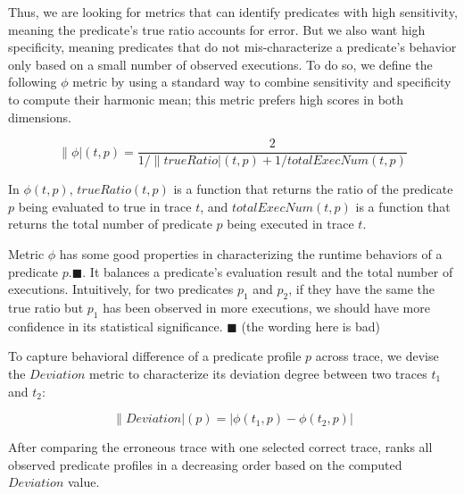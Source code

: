 Thus, we are looking for metrics that can identify
predicates with high sensitivity, meaning the predicate's true
ratio accounts for error. But we also want
high specificity, meaning predicates that do not mis-characterize
a predicate's behavior only based on a small number of
observed executions. To do so, we define the following
$\phi$ metric by using a standard way to
combine sensitivity and specificity to compute their
harmonic mean; this metric prefers high scores in both dimensions. 

\vspace{-3mm}

{\small{
\[
\|\phi|(t, p) = \frac{2}{{1}/{\|trueRatio|(t, p)} + {1}/{totalExecNum(t, p)}}
\]
}}

\vspace{-3mm}

In $\phi(t, p)$, $trueRatio(t, p)$ is a function that returns the ratio of the predicate $p$ being
evaluated to true in trace $t$, and $totalExecNum(t, p)$ is a function
that returns the total number of predicate $p$ being executed in trace $t$.

Metric $\phi$ has some good properties in characterizing the
runtime behaviors of a predicate $p$.$\blacksquare$.
It balances a predicate's evaluation result and the total number of executions.
Intuitively, for two predicates $p_1$ and $p_2$, if they have the same
the true ratio but $p_1$ has been observed in more executions, we
should have more confidence in its statistical significance. $\blacksquare$
(the wording here is bad)

To capture behavioral difference of a predicate profile $p$
across trace, we devise the  $Deviation$ metric
to characterize its deviation degree between two traces $t_1$ and $t_2$:

\vspace{-2mm}

{\small{
\[
\|Deviation|(p) = |\phi(t_1, p) - \phi(t_2, p)|
\]
}}
\vspace{-4mm}

After comparing the erroneous trace with one selected correct trace,
\ourtool ranks all observed predicate profiles in
a decreasing order based on the computed $Deviation$ value.






